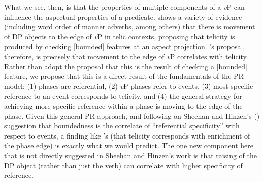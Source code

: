 \documentclass[output=paper
,modfonts
,nonflat
]{langsci/langscibook}
\begin{document}
\z
\noindent What we see, then, is that the properties of multiple components of a \textit{v}P can influence the aspectual properties of a predicate. \citet{Thompson:2006} shows a variety of evidence (including word order of manner adverbs, among others) that there is movement of DP objects to the edge of \textit{v}P in telic contexts, proposing that telicity is produced by checking [bounded] features at an aspect projection.
	\citeauthor{Thompson:2006}’s proposal, therefore, is precisely that movement to the edge of \textit{v}P correlates with telicity. Rather than adopt the proposal that this is the result of checking a [bounded] feature, we propose that this is a direct result of the fundamentals of the PR model: (1) phases are referential, (2) \textit{v}P phases refer to events, (3) most specific reference to an event corresponds to telicity, and (4) the general strategy for achieving more specific reference within a phase is moving to the edge of the phase. Given this general PR approach, and following on Sheehan and Hinzen’s (\citeyear{SheehanHinzen:2011}) suggestion that boundedness is the correlate of ``referential specificity'' with respect to events, a finding like \citeauthor{Thompson:2006}’s (that telicity corresponds with enrichment of the phase edge) is exactly what we would predict. The one new component here that is not directly suggested in Sheehan and Hinzen's work is that raising of the DP object (rather than just the verb) can correlate with higher specificity of reference. 
\end{document}
